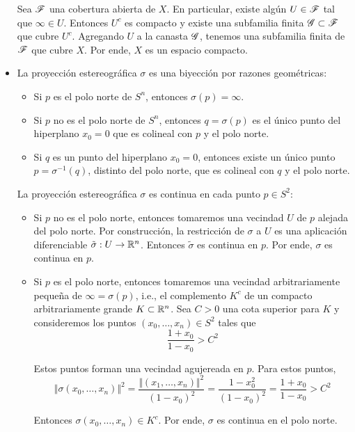 \begin{solution}
\begin{itemize}
    Sea $\mathscr F$ una cobertura abierta de $X$. En particular, existe algún $U \in \mathscr F$ tal que $\infty \in U$.
    Entonces $U^c$ es compacto y existe una subfamilia finita $\mathscr G \subset \mathscr F$ que cubre $U^c$. Agregando $U$ a la canasta $\mathscr G$, tenemos una subfamilia finita de $\mathscr F$ que cubre $X$. Por ende, $X$ es un espacio compacto.
    
    \item La proyección estereográfica $\sigma$ es una biyección por razones geométricas:
    \begin{itemize}
        \item Si $p$ es el polo norte de $S^n$, entonces $\sigma(p) = \infty$.
        \item Si $p$ no es el polo norte de $S^n$, entonces $q = \sigma(p)$ es el único punto del hiperplano $x_0 = 0$  que es colineal con $p$ y el polo norte.
        \item Si $q$ es un punto del hiperplano $x_0 = 0$, entonces existe un único punto $p = \sigma^{-1}(q)$, distinto del polo norte, que es colineal con $q$ y el polo norte.
    \end{itemize}
    
    La proyección estereográfica $\sigma$ es continua en cada punto $p \in S^2$:
    \begin{itemize}
        \item Si $p$ no es el polo norte, entonces tomaremos una vecindad $U$ de $p$ alejada del polo norte. Por construcción, la restricción de $\sigma$ a $U$ es una aplicación diferenciable $\tilde \sigma : U \to \mathbb R^n$. Entonces $\tilde \sigma$ es continua en $p$. Por ende, $\sigma$ es continua en $p$.
        
        \item Si $p$ es el polo norte, entonces tomaremos una vecindad arbitrariamente pequeña de $\infty = \sigma(p)$, i.e., el complemento $K^c$ de un compacto arbitrariamente grande $K \subset \mathbb R^n$. Sea $C > 0$ una cota superior para $K$ y consideremos los puntos $(x_0, \dots, x_n) \in S^2$ tales que
        $$\frac {1 + x_0} {1 - x_0} > C^2$$
        
        Estos puntos forman una vecindad agujereada en $p$. Para estos puntos,
        $$
        \Vert \sigma(x_0, \dots, x_n) \Vert^2
            = \frac {\Vert (x_1, \dots, x_n) \Vert^2} {(1 - x_0)^2}
            = \frac {1 - x_0^2} {(1 - x_0)^2}
            = \frac {1 + x_0} {1 - x_0}
            > C^2
        $$
        
        Entonces $\sigma(x_0, \dots, x_n) \in K^c$. Por ende, $\sigma$ es continua en el polo norte.
    \end{itemize}
    

\end{itemize}
\end{solution}
